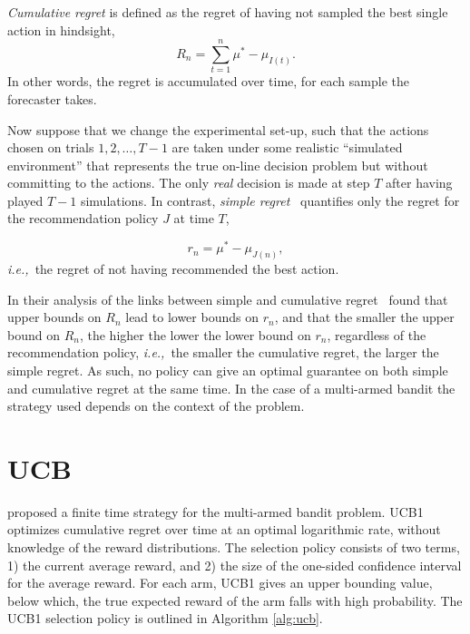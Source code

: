 \documentclass{kecsmstr}
\newcommand{\ie}{{\it i.e.,}~}
\begin{document}
\emph{Cumulative regret} is defined as the regret of having not sampled the best single action in hindsight, 
\begin{equation}
R_n = \sum_{t = 1}^{n}{\mu^* - \mu_{I(t)}}.
\end{equation}
In other words, the regret is accumulated over time, for each sample the forecaster takes.

Now suppose that we change the experimental set-up, such that the actions chosen on trials $1, 2, \ldots, T-1$ are taken under some realistic ``simulated environment'' that represents the true on-line decision problem but without committing to the actions. The only \emph{real} decision is made at step $T$ after having played $T-1$ simulations. In contrast, \emph{simple regret}~ quantifies only the regret for the recommendation policy $J$ at time $T$,

\begin{equation}
r_n = \mu^* - \mu_{J(n)},
\end{equation}
\ie the regret of not having recommended the best action.

In their analysis of the links between simple and cumulative regret~ found that upper bounds on $R_n$ lead to lower bounds on $r_n$, and that the smaller the upper bound on $R_n$, the higher the lower the lower bound on $r_n$, regardless of the recommendation policy, \ie the smaller the cumulative regret, the larger the simple regret. As such, no policy can give an optimal guarantee on both simple and cumulative regret at the same time. In the case of a multi-armed bandit the strategy used depends on the context of the problem.

\section{UCB}
\label{sec:ucb}

 proposed a finite time strategy for the multi-armed bandit problem. UCB1 optimizes cumulative regret over time at an optimal logarithmic rate, without knowledge of the reward distributions. The selection policy consists of two terms, 1) the current average reward, and 2) the size of the one-sided confidence interval for the average reward. For each arm, UCB1 gives an upper bounding value, below which, the true expected reward of the arm falls with high probability. The UCB1 selection policy is outlined in Algorithm \ref{alg:ucb}.
\end{document}
